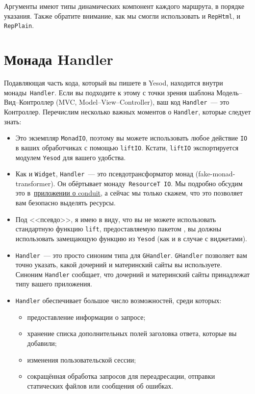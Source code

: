 Аргументы имеют типы динамических компонент каждого маршрута, в порядке
указания. Также обратите внимание, как мы смогли использовать и
\lstinline!RepHtml!, и \lstinline!RepPlain!.

\section{Монада Handler}\label{sec:handler-monad}
Подавляющая часть кода, который вы пишете в Yesod, находится внутри
монады~\lstinline!Handler!. Если вы подходите к этому с точки зрения
шаблона Модель--Вид--Контроллер (MVC, Model--View--Controller), ваш код
\lstinline!Handler!~--- это Контроллер. Перечислим несколько важных
моментов о \lstinline!Handler!, которые следует знать:
\begin{itemize}
\item Это экземпляр \lstinline!MonadIO!, поэтому вы можете
  использовать любое действие \lstinline!IO! в ваших обработчиках с
  помощью \lstinline!liftIO!. Кстати, \lstinline!liftIO! экспортируется
  модулем \lstinline!Yesod! для вашего удобства.
\item Как и \lstinline!Widget!, \lstinline!Handler!~--- это псевдотрансформатор
    монад (fake-monad-transformer). Он обёртывает монаду~\lstinline!ResourceT IO!.
    Мы подробно обсудим это в~\hyperref[chap:conduit]{приложении о conduit}, а
    сейчас мы только скажем, что это позволяет вам безопасно выделять ресурсы.
\item Под <<псевдо>>, я имею в виду, что вы не можете использовать
  стандартную функцию \lstinline!lift!, предоставляемую пакетом
  ,
  вы должны использовать замещающую функцию из \lstinline!Yesod! (как и в
  случае с виджетами).
\item \lstinline!Handler!~--- это просто синоним типа для
  \lstinline!GHandler!. \lstinline!GHandler! позволяет вам точно
  указать, какой дочерний и материнский сайты вы используете. Синоним
  \lstinline!Handler! сообщает, что дочерний и материнский сайты
  принадлежат типу вашего приложения.
\item \lstinline!Handler! обеспечивает большое число возможностей, среди которых:
\begin{itemize}
\item предоставление информации о запросе;
\item хранение списка дополнительных полей заголовка ответа, которые
  вы добавили;
\item изменения пользовательской сессии;
\item сокращённая обработка запросов для переадресации, отправки
  статических файлов или сообщения об ошибках.
\end{itemize}
\end{itemize}

